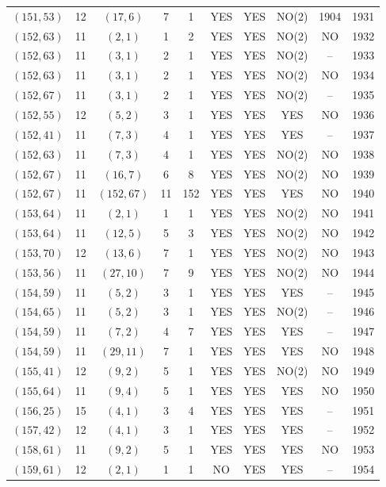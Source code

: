 \begin{longtable}{|c|c|c|c|c|c|c|c|c|c|}
$(151, 53)$ & 12 & $(17, 6)$ & 7 & 1 & YES & YES & NO(2) & 1904 & 1931\\
$(152, 63)$ & 11 & $(2, 1)$ & 1 & 2 & YES & YES & NO(2) & NO & 1932\\
$(152, 63)$ & 11 & $(3, 1)$ & 2 & 1 & YES & YES & NO(2) & -- & 1933\\
$(152, 63)$ & 11 & $(3, 1)$ & 2 & 1 & YES & YES & NO(2) & NO & 1934\\
$(152, 67)$ & 11 & $(3, 1)$ & 2 & 1 & YES & YES & NO(2) & -- & 1935\\
$(152, 55)$ & 12 & $(5, 2)$ & 3 & 1 & YES & YES & YES & NO & 1936\\
$(152, 41)$ & 11 & $(7, 3)$ & 4 & 1 & YES & YES & YES & -- & 1937\\
$(152, 63)$ & 11 & $(7, 3)$ & 4 & 1 & YES & YES & NO(2) & NO & 1938\\
$(152, 67)$ & 11 & $(16, 7)$ & 6 & 8 & YES & YES & NO(2) & NO & 1939\\
$(152, 67)$ & 11 & $(152, 67)$ & 11 & 152 & YES & YES & YES & NO & 1940\\
$(153, 64)$ & 11 & $(2, 1)$ & 1 & 1 & YES & YES & NO(2) & NO & 1941\\
$(153, 64)$ & 11 & $(12, 5)$ & 5 & 3 & YES & YES & NO(2) & NO & 1942\\
$(153, 70)$ & 12 & $(13, 6)$ & 7 & 1 & YES & YES & NO(2) & NO & 1943\\
$(153, 56)$ & 11 & $(27, 10)$ & 7 & 9 & YES & YES & NO(2) & NO & 1944\\
$(154, 59)$ & 11 & $(5, 2)$ & 3 & 1 & YES & YES & YES & -- & 1945\\
$(154, 65)$ & 11 & $(5, 2)$ & 3 & 1 & YES & YES & NO(2) & -- & 1946\\
$(154, 59)$ & 11 & $(7, 2)$ & 4 & 7 & YES & YES & YES & -- & 1947\\
$(154, 59)$ & 11 & $(29, 11)$ & 7 & 1 & YES & YES & YES & NO & 1948\\
$(155, 41)$ & 12 & $(9, 2)$ & 5 & 1 & YES & YES & NO(2) & NO & 1949\\
$(155, 64)$ & 11 & $(9, 4)$ & 5 & 1 & YES & YES & YES & NO & 1950\\
$(156, 25)$ & 15 & $(4, 1)$ & 3 & 4 & YES & YES & YES & -- & 1951\\
$(157, 42)$ & 12 & $(4, 1)$ & 3 & 1 & YES & YES & YES & -- & 1952\\
$(158, 61)$ & 11 & $(9, 2)$ & 5 & 1 & YES & YES & YES & NO & 1953\\
$(159, 61)$ & 12 & $(2, 1)$ & 1 & 1 & NO & YES & YES & -- & 1954\\

\end{longtable}

